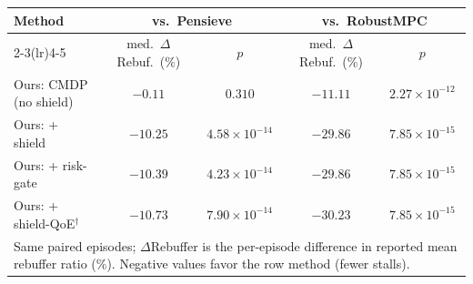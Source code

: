 \begin{tabular}{@{}lcccc@{}}
\toprule
Method & \multicolumn{2}{c}{vs.\ Pensieve} & \multicolumn{2}{c}{vs.\ RobustMPC} \\
\cmidrule(lr){2-3}\cmidrule(lr){4-5}
 & med.\ $\Delta$Rebuf.\ (\%) & $p$ & med.\ $\Delta$Rebuf.\ (\%) & $p$ \\
\midrule
Ours: CMDP (no shield) & $-0.11$ & $0.310$ & $-11.11$ & $2.27\times10^{-12}$ \\
Ours: + shield & $-10.25$ & $4.58\times10^{-14}$ & $-29.86$ & $7.85\times10^{-15}$ \\
Ours: + risk-gate & $-10.39$ & $4.23\times10^{-14}$ & $-29.86$ & $7.85\times10^{-15}$ \\
Ours: + shield-QoE$^{\dagger}$ & $-10.73$ & $7.90\times10^{-14}$ & $-30.23$ & $7.85\times10^{-15}$ \\
\bottomrule
\multicolumn{5}{l}{\footnotesize Same paired episodes; $\Delta$Rebuffer is the per-episode difference in reported mean rebuffer ratio (\%). Negative values favor the row method (fewer stalls).} \\
\end{tabular}